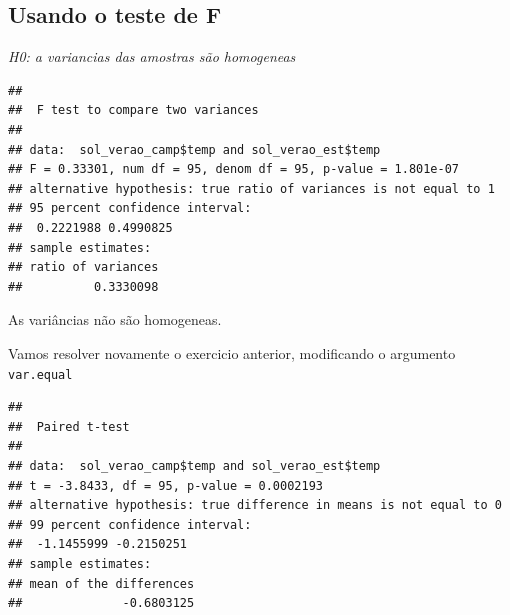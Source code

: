 \documentclass[
]{book}
\newenvironment{Shaded}{\begin{snugshade}}{\end{snugshade}}
\newcommand{\CommentTok}[1]{\textcolor[rgb]{0.56,0.35,0.01}{\textit{#1}}}
\newcommand{\DataTypeTok}[1]{\textcolor[rgb]{0.13,0.29,0.53}{#1}}
\newcommand{\FloatTok}[1]{\textcolor[rgb]{0.00,0.00,0.81}{#1}}
\newcommand{\KeywordTok}[1]{\textcolor[rgb]{0.13,0.29,0.53}{\textbf{#1}}}
\newcommand{\NormalTok}[1]{#1}
\newcommand{\OperatorTok}[1]{\textcolor[rgb]{0.81,0.36,0.00}{\textbf{#1}}}
\begin{document}
\hypertarget{usando-o-teste-de-f}{%
\subsection{Usando o teste de F}\label{usando-o-teste-de-f}}

\emph{H0: a variancias das amostras são homogeneas }

\begin{Shaded}
\end{Shaded}

\begin{verbatim}
## 
##  F test to compare two variances
## 
## data:  sol_verao_camp$temp and sol_verao_est$temp
## F = 0.33301, num df = 95, denom df = 95, p-value = 1.801e-07
## alternative hypothesis: true ratio of variances is not equal to 1
## 95 percent confidence interval:
##  0.2221988 0.4990825
## sample estimates:
## ratio of variances 
##          0.3330098
\end{verbatim}

As variâncias não são homogeneas.

Vamos resolver novamente o exercicio anterior, modificando o argumento \texttt{var.equal}

\begin{Shaded}
\end{Shaded}

\begin{verbatim}
## 
##  Paired t-test
## 
## data:  sol_verao_camp$temp and sol_verao_est$temp
## t = -3.8433, df = 95, p-value = 0.0002193
## alternative hypothesis: true difference in means is not equal to 0
## 99 percent confidence interval:
##  -1.1455999 -0.2150251
## sample estimates:
## mean of the differences 
##              -0.6803125
\end{verbatim}
\end{document}
